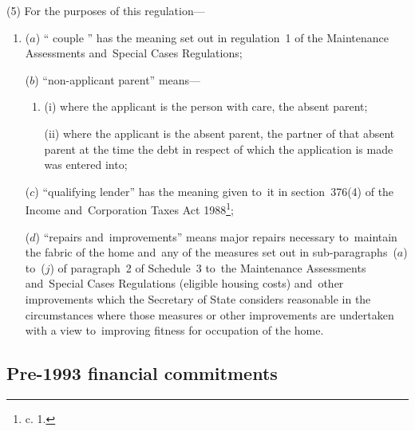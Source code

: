 \documentclass[12pt,a4paper]{article}
\begin{document}
(5) For the purposes of this regulation—
\begin{enumerate}\item[]
($a$) “%
couple%
” has the meaning set out in regulation~1 of the
Maintenance Assessments and~Special Cases Regulations;

($b$) “non-applicant parent” means—
\begin{enumerate}\item[]
(i) where the applicant is the person with care, the absent parent;

(ii) where the applicant is the absent parent, the partner of that absent parent
at the time the debt in respect of which the application is made was entered
into;
\end{enumerate}

($c$) “qualifying lender” has the meaning given to~it in section~376(4) of the
Income and~Corporation Taxes Act 1988\footnote{ c. 1.};

($d$) “repairs and~improvements” means major repairs necessary to~maintain the
fabric of the home and~any of the measures set out in sub-paragraphs~($a$) to~($j$)
of paragraph~2 of Schedule~3 to~the Maintenance Assessments and~Special Cases
Regulations (eligible housing costs) and~other improvements which the Secretary
of State considers reasonable in the circumstances where those measures or other
improvements are undertaken with a view to~improving fitness for occupation of
the home.
\end{enumerate}


\subsection[17. Pre-1993 financial commitments]{Pre-1993 financial commitments}
\end{document}
